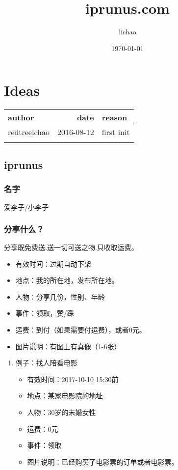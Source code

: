 \documentclass[11pt]{article}
\author{lichao}
\date{\today}
\title{iprunus.com}
\begin{document}
\maketitle
\tableofcontents


\section{Ideas}
\label{sec:org4a85412}
\begin{center}
\begin{tabular}{lrl}
author & date & reason\\
\hline
redtreelchao & 2016-08-12 & first init\\
 &  & \\
\end{tabular}
\end{center}




\subsection{iprunus}
\label{sec:org7d9a20d}
\subsubsection{名字}
\label{sec:org507bd87}
爱李子/小李子
\subsubsection{分享什么？}
\label{sec:orgc9c8f2f}
分享既免费送.送一切可送之物.只收取运费。

\begin{itemize}
\item 有效时间：过期自动下架
\item 地点：我的所在地，发布所在地。
\item 人物：分享几份，性别、年龄
\item 事件：领取，赞/踩
\item 运费：到付（如果需要付运费），或者0元。
\item 图片说明：有图上有真像（1-6张）
\end{itemize}

\begin{enumerate}
\item 例子：找人陪看电影
\label{sec:org7f86ef3}
\begin{itemize}
\item 有效时间：2017-10-10 15:30前
\item 地点：某家电影院的地址
\item 人物：30岁的未婚女性
\item 运费：0元
\item 事件：领取
\item 图片说明：已经购买了电影票的订单或者电影票。
\end{itemize}
\end{enumerate}
\end{document}

